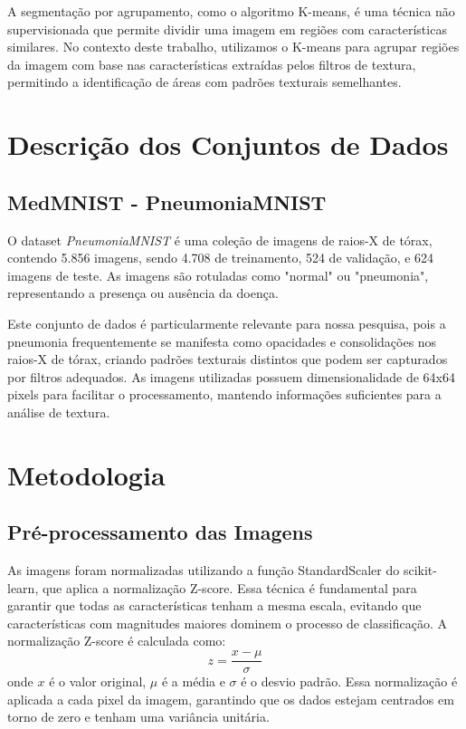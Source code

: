 \documentclass[sigconf,nonacm]{acmart}
\begin{document}
A segmentação por agrupamento, como o algoritmo K-means, é uma técnica não supervisionada que permite dividir uma imagem em regiões com características similares. No contexto deste trabalho, utilizamos o K-means para agrupar regiões da imagem com base nas características extraídas pelos filtros de textura, permitindo a identificação de áreas com padrões texturais semelhantes.

\section{Descrição dos Conjuntos de Dados}
\subsection{MedMNIST - PneumoniaMNIST}

O dataset \textit{PneumoniaMNIST} \cite{medmnistv1_2021} é uma coleção de imagens de raios-X de tórax, contendo 5.856 imagens, sendo 4.708 de treinamento, 524 de validação, e 624 imagens de teste. As imagens são rotuladas como "normal" ou "pneumonia", representando a presença ou ausência da doença.

Este conjunto de dados é particularmente relevante para nossa pesquisa, pois a pneumonia frequentemente se manifesta como opacidades e consolidações nos raios-X de tórax, criando padrões texturais distintos que podem ser capturados por filtros adequados. As imagens utilizadas possuem dimensionalidade de 64x64 pixels para facilitar o processamento, mantendo informações suficientes para a análise de textura.

\section{Metodologia}

\subsection{Pré-processamento das Imagens}

As imagens foram normalizadas utilizando a função StandardScaler do scikit-learn, que aplica a normalização Z-score. Essa técnica é fundamental para garantir que todas as características tenham a mesma escala, evitando que características com magnitudes maiores dominem o processo de classificação.
A normalização Z-score é calculada como:
\[
z = \frac{x - \mu}{\sigma}
\]
onde \(x\) é o valor original, \(\mu\) é a média e \(\sigma\) é o desvio padrão. Essa normalização é aplicada a cada pixel da imagem, garantindo que os dados estejam centrados em torno de zero e tenham uma variância unitária.
\end{document}
